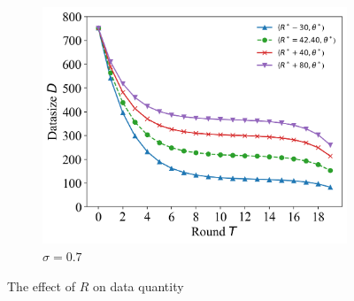 \documentclass{article}
\theoremstyle{plain}
\theoremstyle{definition}
\theoremstyle{remark}
\begin{document}
\begin{figure}
\begin{subfigure}{0.31\textwidth}
		\includegraphics[width=\textwidth]{figures/figure_72_C.png}
    \caption{$\sigma=0.7$}
	\end{subfigure}
	\caption{The effect of $R$ on data quantity}
\end{figure}
\end{document}
